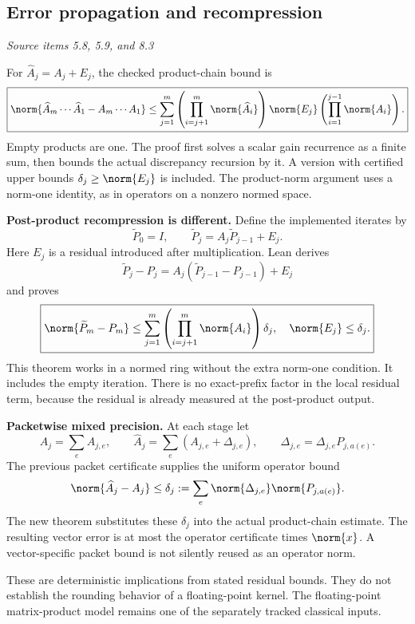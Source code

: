 \subsection{Error propagation and recompression}\label{supp3:subsection:002}\textit{Source items 5.8, 5.9, and 8.3}\par
For $\widehat A_j=A_j+E_j$, the checked product-chain bound is
\[
\boxed{
\norm{\widehat A_m\cdots\widehat A_1-A_m\cdots A_1}
\leq\sum_{j=1}^m
 \left(\prod_{i=j+1}^m\norm{\widehat A_i}\right)
 \norm{E_j}
 \left(\prod_{i=1}^{j-1}\norm{A_i}\right).}
\]
Empty products are one. The proof first solves a scalar gain recurrence as a finite sum, then bounds the actual discrepancy recursion by it. A version with certified upper bounds $\delta_j\geq\norm{E_j}$ is included. The product-norm argument uses a norm-one identity, as in operators on a nonzero normed space.

\textbf{Post-product recompression is different.} Define the implemented iterates by
\[
\widetilde P_0=I,\qquad
\widetilde P_j=A_j\widetilde P_{j-1}+E_j.
\]
Here $E_j$ is a residual introduced after multiplication. Lean derives
\[
\widetilde P_j-P_j=A_j(\widetilde P_{j-1}-P_{j-1})+E_j
\]
and proves
\[
\boxed{\norm{\widetilde P_m-P_m}
\leq\sum_{j=1}^m\left(\prod_{i=j+1}^m\norm{A_i}\right)\delta_j,
\quad \norm{E_j}\leq\delta_j.}
\]
This theorem works in a normed ring without the extra norm-one condition. It includes the empty iteration. There is no exact-prefix factor in the local residual term, because the residual is already measured at the post-product output.

\textbf{Packetwise mixed precision.} At each stage let
\[
A_j=\sum_e A_{j,e},\qquad
\widehat A_j=\sum_e(A_{j,e}+\Delta_{j,e}),\qquad
\Delta_{j,e}=\Delta_{j,e}P_{j,a(e)}.
\]
The previous packet certificate supplies the uniform operator bound
\[
\norm{\widehat A_j-A_j}\leq
\delta_j:=\sum_e\norm{\Delta_{j,e}}\norm{P_{j,a(e)}}.
\]
The new theorem substitutes these $\delta_j$ into the actual product-chain estimate. The resulting vector error is at most the operator certificate times $\norm{x}$. A vector-specific packet bound is not silently reused as an operator norm.

These are deterministic implications from stated residual bounds. They do not establish the rounding behavior of a floating-point kernel. The floating-point matrix-product model remains one of the separately tracked classical inputs.




